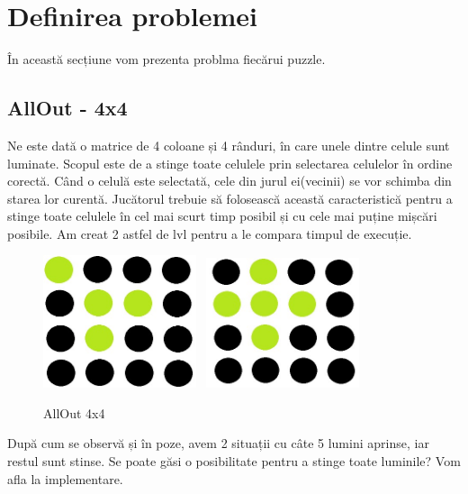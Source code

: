 \section{Definirea problemei}
În această secțiune vom prezenta problma fiecărui puzzle.
\newline


\subsection{AllOut - 4x4}

\newline\newline
 \newline \newline Ne este dată o matrice de 4 coloane și 4 rânduri, în care unele dintre celule sunt luminate. Scopul este de a stinge toate celulele prin selectarea celulelor în ordine corectă. Când o celulă este selectată, cele din jurul ei(vecinii) se vor schimba din starea lor curentă. Jucătorul trebuie să folosească această caracteristică pentru a stinge toate celulele în cel mai scurt timp posibil și cu cele mai puține mișcări posibile.\newline
\newline Am creat 2 astfel de lvl pentru a le compara timpul de execuție.\newline
 \newline
  \newline
\begin{figure}[h]
\centering
 \includegraphics[width=0.4\textwidth]{text/images/pic2.jpeg}\
  \hfill
  \includegraphics[width=0.4\textwidth]{text/images/pic3.jpeg}\
   \newline
    \caption{AllOut 4x4}
\end{figure} \newline \newline
 \newline După cum se observă și în poze, avem 2 situații cu câte 5 lumini aprinse, iar restul sunt stinse.
Se poate găsi o posibilitate pentru a stinge toate luminile?
Vom afla la implementare.

